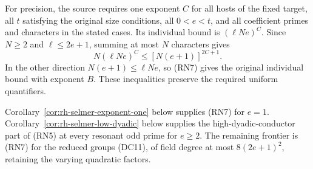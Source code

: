 For precision, the source requires one exponent $C$ for
all hosts of the fixed target, all $t$ satisfying the
original size conditions, all $0<e<t$, and all coefficient
primes and characters in the stated cases.  Its individual
bound is $(\ell Ne)^C$\cite{rh-selmer-nonresonant-source}.
Since $N\ge2$ and $\ell\le2e+1$, summing at most $N$
characters gives
\[
 N(\ell Ne)^C\le[N(e+1)]^{2C+1}.
\]
In the other direction $N(e+1)\le\ell Ne$, so (RN7)
gives the original individual bound with exponent $B$.
These inequalities preserve the required uniform quantifiers.

Corollary~\ref{cor:rh-selmer-exponent-one} below supplies (RN7)
for $e=1$. Corollary~\ref{cor:rh-selmer-low-dyadic} below
supplies the high-dyadic-conductor part of (RN5) at every
resonant odd prime for $e\ge2$. The remaining frontier is
(RN7) for the reduced groups (DC11), of field degree at most
$8(2e+1)^2$, retaining the varying quadratic factors.
